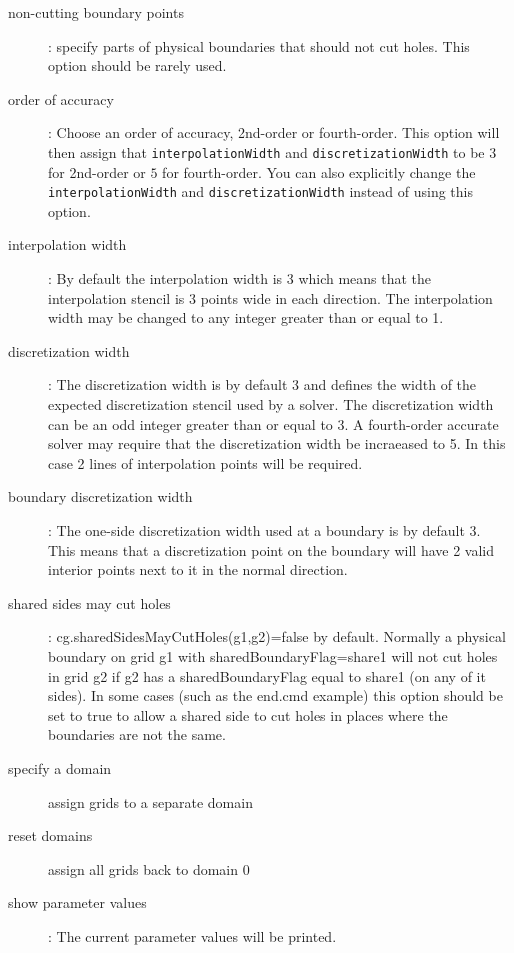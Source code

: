 \begin{description}
  \item[non-cutting boundary points] : specify parts of physical boundaries that should not cut holes.
            This option should be rarely used.
  \item[order of accuracy] : Choose an order of accuracy, 2nd-order or fourth-order. This
     option will then assign that {\tt interpolationWidth} and {\tt discretizationWidth}
     to be $3$ for 2nd-order or $5$ for fourth-order. You can also explicitly change
     the {\tt interpolationWidth} and {\tt discretizationWidth} instead of using this option.
  \item[interpolation width] : By default the interpolation width is 3 which means that the
     interpolation stencil is 3 points wide in each direction. The interpolation width may
     be changed to any integer greater than or equal to 1.
  \item[discretization width] : The discretization width is by default 3 and defines the width
     of the expected discretization stencil used by a solver. The discretization width can
     be an odd integer greater than or equal to 3. A fourth-order accurate solver may require
     that the discretization width be incraeased to 5. In this case 2 lines of interpolation
     points will be required.
  \item[boundary discretization width] : The one-side discretization width used at a boundary
      is by default 3. This means that a discretization point on the boundary will have 2 valid
      interior points next to it in the normal direction.
  \item[shared sides may cut holes] : cg.sharedSidesMayCutHoles(g1,g2)=false by default. 
     Normally a physical boundary on grid g1 
     with sharedBoundaryFlag=share1 will not cut holes in grid g2 if g2 has a sharedBoundaryFlag
     equal to share1 (on any of it sides). In some cases (such as the end.cmd example) this
     option should be set to true to allow a shared side to cut holes in places where the
     boundaries are not the same.
  \item[specify a domain] assign grids to a separate domain
  \item[reset domains] assign all grids back to domain 0
  \item[show parameter values] : The current parameter values will be printed.
 \end{description}
